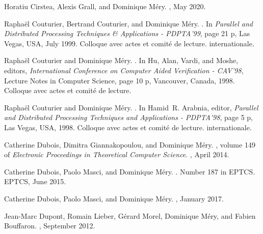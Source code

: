 \documentclass[ 12pt]{article}
\begin{document}
\begin{thebibliography}{100}
Horatiu Cirstea, Alexis Grall, and Dominique M{\'e}ry.
, May 2020.

Rapha{\"e}l Couturier, Bertrand Couturier, and Dominique M{\'e}ry.
.
\newblock In {\em {Parallel and Distributed Processing Techniques \&
  Applications - PDPTA'99}}, page 21 p, Las Vegas, USA, July 1999.
\newblock Colloque avec actes et comit{\'e} de lecture. internationale.

Rapha{\"e}l Couturier and Dominique M{\'e}ry.
.
\newblock In Hu, Alan, Vardi, and Moshe, editors, {\em {International
  Conference on Computer Aided Verification - CAV'98}}, Lecture Notes in
  Computer Science, page 10 p, Vancouver, Canada, 1998.
\newblock Colloque avec actes et comit{\'e} de lecture.

Rapha{\"e}l Couturier and Dominique M{\'e}ry.
.
\newblock In Hamid~R. Arabnia, editor, {\em {Parallel and Distributed
  Processing Techniques and Applications - PDPTA'98}}, page 5 p, Las Vegas,
  USA, 1998.
\newblock Colloque avec actes et comit{\'e} de lecture. internationale.

Catherine Dubois, Dimitra Giannakopoulou, and Dominique M{\'e}ry.
, volume 149 of {\em Electronic Proceedings in Theoretical
  Computer Science}.
, April 2014.

Catherine Dubois, Paolo Masci, and Dominique M{\'e}ry.
.
\newblock Number 187 in EPTCS. {EPTCS}, June 2015.

Catherine Dubois, Paolo Masci, and Dominique M{\'e}ry.
, January
  2017.

Jean-Marc Dupont, Romain Lieber, G{\'e}rard Morel, Dominique M{\'e}ry, and
  Fabien Bouffaron.
, September 2012.


\end{thebibliography}
\end{document}
